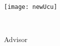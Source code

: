 \makeatletter
\begin{titlepage}
    \begin{center}
        \texttt{[image: newUcu]}

	\vspace*{3cm}

	{\Huge \textbf{\thetitle} \par}

	{\Large \@subtitle \par}

	\vspace*{1.0cm}

	{\LARGE \@course \par}

	\vspace*{3.5cm}

	{\LARGE \theauthor \par}

	\vspace*{1.0cm}

	{\LARGE \@supervisor\\
	{\large Advisor \par} \par}

        \vfill

	{\Large \@institute}

	{\Large \thedate \par}

    \end{center}
\end{titlepage}
\makeatother

